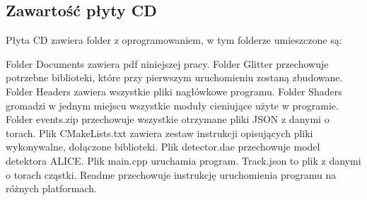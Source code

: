 \begin{appendices}
\newpage
\section{Zawartość płyty CD}
Płyta CD zawiera folder z oprogramowaniem, w tym folderze umieszczone są: 
\begin{itemize}
\itemi Folder Documents zawiera pdf niniejszej pracy.
\itemi Folder Glitter przechowuje potrzebne biblioteki, które przy pierwszym uruchomieniu zostaną zbudowane.
\itemi Folder Headers zawiera wszystkie pliki nagłówkowe programu.
\itemi Folder Shaders gromadzi w jednym miejscu wszystkie moduły cieniujące użyte w programie.
\itemi Folder events.zip przechowuje wszystkie otrzymane pliki JSON z danymi o torach.
\itemi Plik CMakeLists.txt zawiera zestaw instrukcji opisujących pliki wykonywalne, dołączone biblioteki. 
\itemi Plik detector.dae przechowuje model detektora ALICE.
\itemi Plik main.cpp uruchamia program.
\itemi Track.json to plik z danymi o torach cząstki.
\itemi Readme przechowuje instrukcję uruchomienia programu na różnych platformach.
\end{itemize}
\end{appendices}


